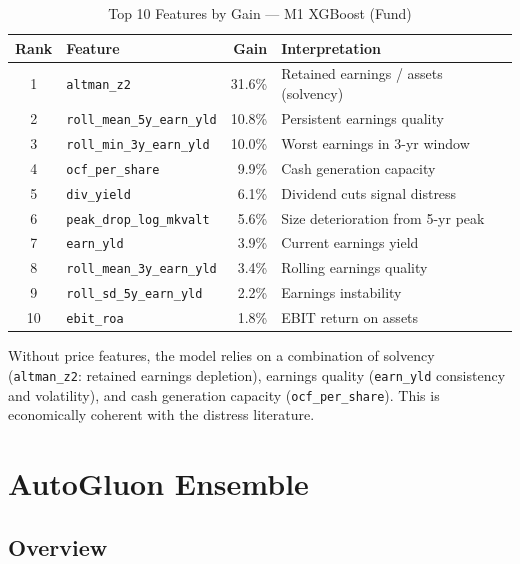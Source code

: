 \documentclass{report}\usepackage[]{graphicx}\usepackage[table]{xcolor}
\begin{document}
\begin{table}[H]
\centering
\caption{Top 10 Features by Gain — M1 XGBoost (Fund)}
\begin{tabular}{clrl}
\toprule
\textbf{Rank} & \textbf{Feature} & \textbf{Gain} & \textbf{Interpretation} \\
\midrule
1 & \texttt{altman\_z2} & 31.6\% & Retained earnings / assets (solvency) \\
2 & \texttt{roll\_mean\_5y\_earn\_yld} & 10.8\% & Persistent earnings quality \\
3 & \texttt{roll\_min\_3y\_earn\_yld} & 10.0\% & Worst earnings in 3-yr window \\
4 & \texttt{ocf\_per\_share} & 9.9\% & Cash generation capacity \\
5 & \texttt{div\_yield} & 6.1\% & Dividend cuts signal distress \\
6 & \texttt{peak\_drop\_log\_mkvalt} & 5.6\% & Size deterioration from 5-yr peak \\
7 & \texttt{earn\_yld} & 3.9\% & Current earnings yield \\
8 & \texttt{roll\_mean\_3y\_earn\_yld} & 3.4\% & Rolling earnings quality \\
9 & \texttt{roll\_sd\_5y\_earn\_yld} & 2.2\% & Earnings instability \\
10 & \texttt{ebit\_roa} & 1.8\% & EBIT return on assets \\
\bottomrule
\end{tabular}
\end{table}

\noindent Without price features, the model relies on a combination of solvency 
(\texttt{altman\_z2}: retained earnings depletion), earnings quality 
(\texttt{earn\_yld} consistency and volatility), and cash generation capacity 
(\texttt{ocf\_per\_share}). This is economically coherent with the distress literature.

\chapter{AutoGluon Ensemble}
\label{ch:autogluon}

\section{Overview}
\end{document}
